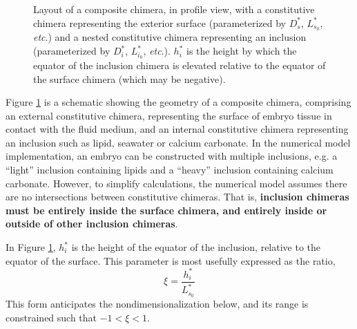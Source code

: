 \documentclass[10pt,a4paper]{article}
\def\etc{\emph{etc}.\xspace}
\begin{document}
\begin{figure}[t]
\begin{center}
{\begin{tikzpicture}
			\end{tikzpicture}
		}
	\end{center}
	\caption{Layout of a composite chimera, in profile view, with a constitutive chimera representing the exterior surface (parameterized by $D_s^*$, $L^*_{s_0}$, \etc) and a nested constitutive chimera representing an inclusion (parameterized by $D_i^*$, $L^*_{i_0}$, \etc). 
	$h_i^*$ is the height by which the equator of the inclusion chimera is elevated relative to the equator of the surface chimera (which may be negative). 
	} \label{fig:chimera2}
\end{figure}
\noindent
Figure \ref{fig:chimera2} is a schematic showing the geometry of a composite chimera, comprising an external constitutive chimera, representing the surface of embryo tissue in contact with the fluid medium, and an internal constitutive chimera representing an inclusion such as lipid, seawater or calcium carbonate.
In the numerical model implementation, an embryo can be constructed with multiple inclusions, e.g. a ``light'' inclusion containing lipids and a ``heavy'' inclusion containing calcium carbonate.
However, to simplify calculations, the numerical model assumes there are no intersections between constitutive chimeras.
That is, \textbf{inclusion chimeras must be entirely inside the surface chimera, and entirely inside or outside of other inclusion chimeras}.

In Figure \ref{fig:chimera2}, $h_i^*$ is the height of the equator of the inclusion, relative to the equator of the surface. 
This parameter is most usefully expressed as the ratio, 
\begin{equation}\label{phi_eq}
	\xi = \frac{h_i^*}{L_{s_0}^*}
\end{equation}
This form anticipates the nondimensionalization below, and its range is constrained such that $-1 < \xi < 1$.
\end{document}
